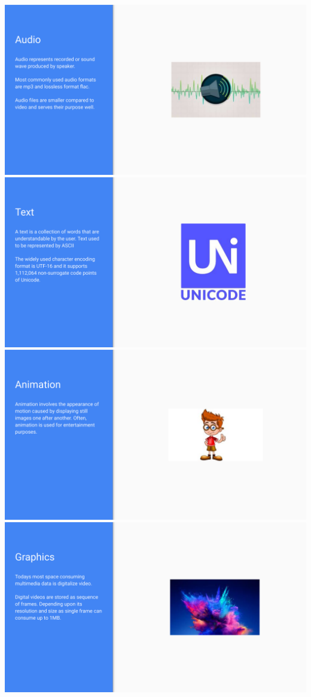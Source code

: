\documentclass[17pt,a4paper,oneside,margin=1in]{article}
\begin{document}
\begin{center}
	\includegraphics[width=0.7\linewidth]{./scrot/multimedia-4.png}
	\includegraphics[width=0.7\linewidth]{./scrot/multimedia-5.png}
	\includegraphics[width=0.7\linewidth]{./scrot/multimedia-6.png}
	\includegraphics[width=0.7\linewidth]{./scrot/multimedia-7.png}
\end{center}
\end{document}
